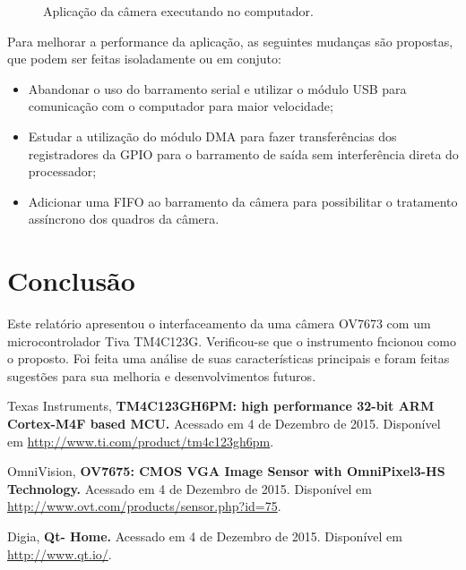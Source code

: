 \documentclass[hidelinks, a4paper, 9pt, twocolumn]{article}
\newcommand{\fig}[4][ht!]{
  \begin{figure}[#1]
    {\centering{\texttt{[image: \#2]}}\par}
    \caption{#3}
    \label{fig:#2}
  \end{figure}
}
\begin{document}
\fig{app1}{Aplicação da câmera executando no computador.}{width=0.8\columnwidth}

Para melhorar a performance da aplicação, as seguintes mudanças são propostas, que podem ser feitas isoladamente ou em conjuto:
\begin{itemize}
\item Abandonar o uso do barramento serial e utilizar o módulo USB para comunicação com o computador para maior velocidade;
\item Estudar a utilização do módulo DMA para fazer transferências dos registradores da GPIO para o barramento de saída sem interferência direta do processador;
\item Adicionar uma FIFO ao barramento da câmera para possibilitar o tratamento assíncrono dos quadros da câmera.
\end{itemize}

\section{Conclusão}

Este relatório apresentou o interfaceamento da uma câmera OV7673 com um microcontrolador Tiva TM4C123G. Verificou-se que o
instrumento fncionou como o proposto. Foi feita uma análise de suas características principais e foram feitas sugestões para sua melhoria
e desenvolvimentos futuros.


\begin{thebibliography}{9}

 Texas Instruments, \textbf{TM4C123GH6PM: high performance 32-bit ARM Cortex-M4F based MCU.} Acessado em 4 de Dezembro de 2015. Disponível em \url{http://www.ti.com/product/tm4c123gh6pm}. 

 OmniVision, \textbf{OV7675:
CMOS VGA Image Sensor with OmniPixel3-HS Technology.} Acessado em 4 de Dezembro de 2015. Disponível em \url{http://www.ovt.com/products/sensor.php?id=75}. 

 Digia, \textbf{Qt- Home.} Acessado em 4 de Dezembro de 2015. Disponível em \url{http://www.qt.io/}. 

\end{thebibliography}
\end{document}
